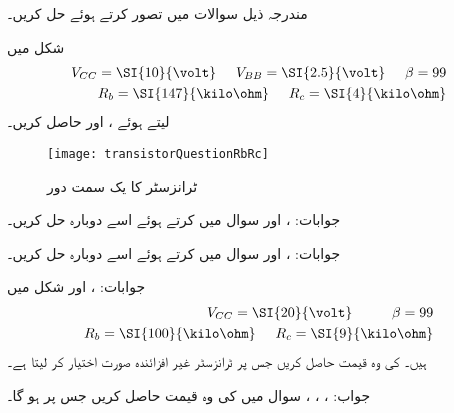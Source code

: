\newpage
{}
مندرجہ ذیل سوالات میں  تصور کرتے ہوئے حل کریں۔

 
شکل   میں
\begin{align*}
V_{CC}=\SI{10}{\volt} \hspace{5mm} V_{BB}=\SI{2.5}{\volt} \hspace{5mm} \beta=99\\
R_b=\SI{147}{\kilo \ohm} \hspace{5mm} R_c=\SI{4}{\kilo \ohm}
\end{align*}
لیتے ہوئے ،  اور  حاصل کریں۔
\begin{figure}
\centering
\texttt{[image: transistorQuestionRbRc]}
\caption{ ٹرانزسٹر کا یک سمت دور}
\label{شکل_ٹرانزسٹر_یکسمتی_دور_سوال}
\end{figure}

جوابات: ،  اور 
سوال  میں  کرتے ہوئے اسے دوبارہ حل کریں۔

جوابات: ،  اور 
سوال   میں  کرتے ہوئے اسے دوبارہ حل کریں۔

جوابات: ،  اور 
 
شکل   میں
\begin{align*}
V_{CC}=\SI{20}{\volt} \hspace{5mm}  \hspace{5mm} \beta=99\\
R_b=\SI{100}{\kilo \ohm} \hspace{5mm} R_c=\SI{9}{\kilo \ohm}
\end{align*}
ہیں۔ کی وہ قیمت حاصل کریں جس پر ٹرانزسٹر غیر افزائندہ  صورت اختیار کر لیتا ہے۔

جواب: ، ، ، 
سوال  میں  کی وہ قیمت حاصل کریں جس پر  ہو گا۔

